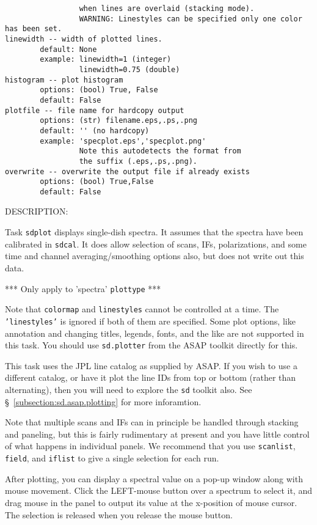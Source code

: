 \begin{verbatim}
                 when lines are overlaid (stacking mode).
                 WARNING: Linestyles can be specified only one color has been set.
linewidth -- width of plotted lines.
        default: None
        example: linewidth=1 (integer)
                 linewidth=0.75 (double)
histogram -- plot histogram
        options: (bool) True, False
        default: False
plotfile -- file name for hardcopy output
        options: (str) filename.eps,.ps,.png
        default: '' (no hardcopy)
        example: 'specplot.eps','specplot.png'
                 Note this autodetects the format from
                 the suffix (.eps,.ps,.png).
overwrite -- overwrite the output file if already exists
        options: (bool) True,False
        default: False
\end{verbatim}
    DESCRIPTION:
    
    Task {\tt sdplot} displays single-dish spectra.  
    It assumes that the spectra have been calibrated in {\tt sdcal}.
    It does allow selection of scans, IFs, polarizations, and
    some time and channel averaging/smoothing options also,
    but does not write out this data.
    
    *** Only apply to 'spectra' {\tt plottype} ***

    Note that {\tt colormap} and {\tt linestyles} cannot be controlled at a time.
    The {\tt 'linestyles'} is ignored if both of them are specified.
    Some plot options, like annotation and changing titles,
    legends, fonts, and the like are not supported in this task.
    You should use {\tt sd.plotter} from the ASAP toolkit directly for this.

    This task uses the JPL line catalog as supplied by ASAP.
    If you wish to use a different catalog, or have it plot
    the line IDs from top or bottom (rather than alternating),
    then you will need to explore the {\tt sd} toolkit also.
    See \S~\ref{subsection:sd.asap.plotting} for more inforamtion.
    
    Note that multiple scans and IFs can in principle be handled
    through stacking and paneling, but this is fairly rudimentary
    at present and you have little control of what happens in
    individual panels.  We recommend that you use {\tt scanlist}, 
    {\tt field}, and {\tt iflist} to give a single selection for each run.
    
    After plotting, you can display a spectral value on a pop-up
    window along with mouse movement. Click the LEFT-mouse button
    over a spectrum to select it, and drag mouse in the panel to
    output its value at the x-position of mouse cursor. The selection
    is released when you release the mouse button.

